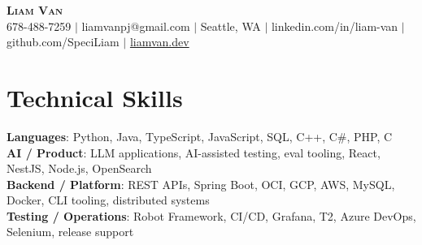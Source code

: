 \documentclass[letterpaper,11pt]{article}
\begin{document}

%
\begin{center}
    \textbf{\Huge \scshape Liam Van} \\ \vspace{1pt}
    \small 678-488-7259 $|$ \small {liamvanpj@gmail.com} $|$ Seattle, WA
 {{$|$ linkedin.com/in/liam-van} {$|$ github.com/SpeciLiam} {$|$ \href{https://liamvan.dev}{liamvan.dev}}}

\end{center}

\section{Technical Skills}
 \begin{itemize}[leftmargin=0.15in, label={}]
    \small{\item{
     \textbf{Languages}{: Python, Java, TypeScript, JavaScript, SQL, C++, C\#, PHP, C} \\
     \textbf{AI / Product}{: LLM applications, AI-assisted testing, eval tooling, React, NestJS, Node.js, OpenSearch} \\
     \textbf{Backend / Platform}{: REST APIs, Spring Boot, OCI, GCP, AWS, MySQL, Docker, CLI tooling, distributed systems} \\
     \textbf{Testing / Operations}{: Robot Framework, CI/CD, Grafana, T2, Azure DevOps, Selenium, release support} \\
    }}
 \end{itemize}
%

\end{document}
